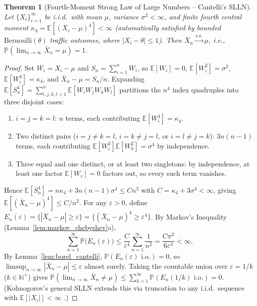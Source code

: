 \documentclass[oneside,noexaminfo,english]{sapthesis}
\numberwithin{equation}{section}
\numberwithin{figure}{section}
\numberwithin{table}{section}
\theoremstyle{compactplain}
\newtheorem{theorem}{Theorem}[section]
\theoremstyle{compactdef}
\theoremstyle{compactrem}
\newcommand{\E}{\mathbb{E}}
\newcommand{\Prob}{\mathbb{P}}
\newcommand{\N}{\mathbb{N}}
\newcommand{\as}{\overset{\mathrm{a.s.}}{\longrightarrow}}
\begin{document}
\begin{theorem}[Fourth-Moment Strong Law of Large Numbers -- Cantelli's SLLN]
\label{thm:slln}
Let $\{X_i\}_{i=1}^\infty$ be i.i.d.\ with mean $\mu$, variance $\sigma^2 < \infty$, and finite fourth central moment $\kappa_4 = \E[(X_i - \mu)^4] < \infty$ (automatically satisfied by bounded $\mathrm{Bernoulli}(\theta)$ traffic outcomes, where $|X_i - \theta| \le 1$). Then $\bar{X}_n \as \mu$, i.e., $\Prob(\lim_{n\to\infty} \bar{X}_n = \mu) = 1$.
\end{theorem}
\begin{proof}
Set $W_i = X_i - \mu$ and $S_n = \sum_{i=1}^n W_i$, so $\E[W_i] = 0$, $\E[W_i^2] = \sigma^2$, $\E[W_i^4] = \kappa_4$, and $\bar{X}_n - \mu = S_n / n$. Expanding $\E[S_n^4] = \sum_{i,j,k,l=1}^n \E[W_i W_j W_k W_l]$ partitions the $n^4$ index quadruples into three disjoint cases:
\begin{enumerate}[label=\arabic*.]
    \item $i = j = k = l$: $n$ terms, each contributing $\E[W_i^4] = \kappa_4$.
    \item Two distinct pairs ($i=j \neq k=l$, $i=k \neq j=l$, or $i=l \neq j=k$): $3n(n-1)$ terms, each contributing $\E[W_i^2]\E[W_k^2] = \sigma^4$ by independence.
    \item Three equal and one distinct, or at least two singletons: by independence, at least one factor $\E[W_r] = 0$ factors out, so every such term vanishes.
\end{enumerate}
Hence $\E[S_n^4] = n\kappa_4 + 3n(n-1)\sigma^4 \le C n^2$ with $C = \kappa_4 + 3\sigma^4 < \infty$, giving $\E[(\bar{X}_n - \mu)^4] \le C / n^2$. For any $\varepsilon > 0$, define $E_n(\varepsilon) = \{|\bar{X}_n - \mu| \ge \varepsilon\} = \{(\bar{X}_n - \mu)^4 \ge \varepsilon^4\}$. By Markov's Inequality (Lemma~\ref{lem:markov_chebyshev}a),
\begin{equation*}
    \sum_{n=1}^\infty \Prob\bigl(E_n(\varepsilon)\bigr) \le \frac{C}{\varepsilon^4}\sum_{n=1}^\infty \frac{1}{n^2} = \frac{C\pi^2}{6\varepsilon^4} < \infty.
\end{equation*}
By Lemma~\ref{lem:borel_cantelli}, $\Prob(E_n(\varepsilon)\text{ i.o.}) = 0$, so $\limsup_{n\to\infty}|\bar{X}_n - \mu| \le \varepsilon$ almost surely. Taking the countable union over $\varepsilon = 1/k$ ($k \in \N^+$) gives $\Prob(\lim_{n\to\infty}\bar{X}_n \neq \mu) \le \sum_{k=1}^\infty \Prob(E_n(1/k)\text{ i.o.}) = 0$. (Kolmogorov's general SLLN extends this via truncation to any i.i.d.\ sequence with $\E[|X_i|] < \infty$ \cite{billingsley1995}.)
\end{proof}
\end{document}
